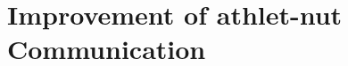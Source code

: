 \chapter{Improvement of \acrshort{athlet}-\acrshort{nut} Communication} \label{chapter:accumulator}


















